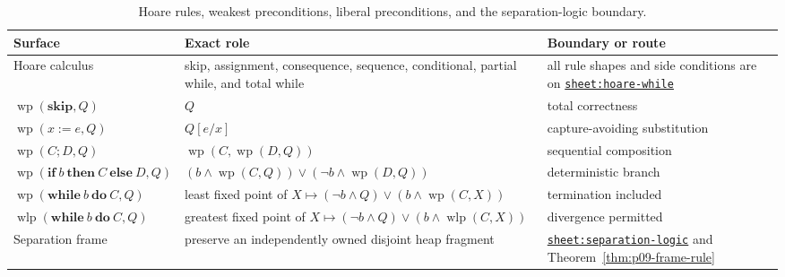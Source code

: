 \begin{table}[htbp]
\centering\small
\begin{tabularx}{\textwidth}{@{}l X X@{}}
\toprule
Surface & Exact role & Boundary or route \\
\midrule
Hoare calculus & skip, assignment, consequence, sequence, conditional,
partial while, and total while & all rule shapes and side conditions are on
\hyperref[sheet:hoare-while]{\texttt{sheet:hoare-while}} \\
\(\operatorname{wp}(\mathbf{skip},Q)\) & \(Q\) & total correctness \\
\(\operatorname{wp}(x:=e,Q)\) & \(Q[e/x]\) & capture-avoiding substitution \\
\(\operatorname{wp}(C;D,Q)\) &
\(\operatorname{wp}(C,\operatorname{wp}(D,Q))\) & sequential composition \\
\(\operatorname{wp}(\mathbf{if}\ b\ \mathbf{then}\ C\ \mathbf{else}\ D,Q)\) &
\((b\land\operatorname{wp}(C,Q))\lor
(\neg b\land\operatorname{wp}(D,Q))\) & deterministic branch \\
\(\operatorname{wp}(\mathbf{while}\ b\ \mathbf{do}\ C,Q)\) &
least fixed point of
\(X\mapsto(\neg b\land Q)\lor(b\land\operatorname{wp}(C,X))\) &
termination included \\
\(\operatorname{wlp}(\mathbf{while}\ b\ \mathbf{do}\ C,Q)\) &
greatest fixed point of
\(X\mapsto(\neg b\land Q)\lor(b\land\operatorname{wlp}(C,X))\) &
divergence permitted \\
Separation frame & preserve an independently owned disjoint heap fragment &
\hyperref[sheet:separation-logic]{\texttt{sheet:separation-logic}} and
Theorem~\ref{thm:p09-frame-rule} \\
\bottomrule
\end{tabularx}
\caption{Hoare rules, weakest preconditions, liberal preconditions, and the
separation-logic boundary.}
\label{tab:p09-hoare-wp}
\end{table}


